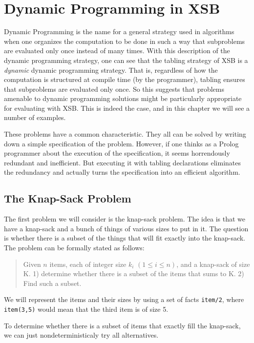 \chapter{Dynamic Programming in XSB}

Dynamic Programming is the name for a general strategy used in
algorithms when one organizes the computation to be done in such a way
that subproblems are evaluated only once instead of many times.  With
this description of the dynamic programming strategy, one can see that
the tabling strategy of XSB is a {\em dynamic} dynamic programming
strategy.  That is, regardless of how the computation is structured at
compile time (by the programmer), tabling ensures that subproblems are
evaluated only once.  So this suggests that problems amenable to
dynamic programming solutions might be particularly appropriate for
evaluating with XSB.  This is indeed the case, and in this chapter we
will see a number of examples.  

These problems have a common characteristic.  They all can be solved
by writing down a simple specification of the problem.  However, if
one thinks as a Prolog programmer about the execution of the
specification, it seems horrendously redundant and inefficient.  But
executing it with tabling declarations eliminates the redundancy and
actually turns the specification into an efficient algorithm.

\section{The Knap-Sack Problem}

The first problem we will consider is the knap-sack problem.  The idea
is that we have a knap-sack and a bunch of things of various sizes to
put in it.  The question is whether there is a subset of the things
that will fit exactly into the knap-sack.  The problem can be formally
stated as follows:

\begin{quote}
  Given $n$ items, each of integer size $k_i$ $(1 \le i \le n)$, and a
  knap-sack of size K.  1) determine whether there is a subset of the
  items that sums to K.  2) Find such a subset.
\end{quote}

We will represent the items and their sizes by using a set of facts
\verb|item/2|, where \verb|item(3,5)| would mean that the third item
is of size 5.

To determine whether there is a subset of items that exactly fill the
knap-sack, we can just nondeterministicaly try all alternatives.

